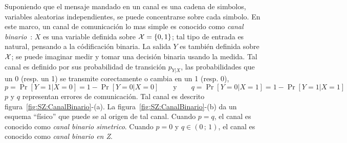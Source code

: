 \begin{figure}[h!]
%
\begin{center}  \end{center}
%
\label{fig:SZ:CanalComunicacion}
\end{figure}




Suponiendo  que el  mensaje  mandado en  un  canal es  una  cadena de  simbolos,
variables   aleatorias  independientes,   se  puede   concentrarse   sobre  cada
simbolo. En  este marco, un  canal de comunicaci\'on  lo mas simple  es conocido
como  {\it canal  binario}~\cite[Sec.~15]{Sha48}: $X$  es una  variable definida
sobre  $\mathcal{X} =  \{ 0  , 1  \}$;  tal tipo  de entrada  es natural,  pensando a  la
c\'odificaci\'on binaria.   La salida $Y$  es tambi\'en definida sobre  $\mathcal{X}$; se
puede imaginar medir y tomar una decisi\'on binaria usando la medida.  Tal canal
es   definido  por  sus   probabilidad  de   transici\'on  $p_{Y|X}$,   \ie  las
probabilidades que un 0 (resp. un 1)  se transmite corectamente o cambia en un 1
(resp. 0),  \ie
%
\[
p = \Pr[Y = 1 | X = 0] = 1 - \Pr[Y = 0 | X = 0] \qquad \mbox{y} \qquad q = \Pr[Y
= 0 | X = 1] = 1 - \Pr[Y = 1 | X = 1]
\]
%
$p$  y  $q$  representan  errores  de comunicaci\'on.   Tal  canal  es  descrito
figura~\ref{fig:SZ:CanalBinario}-(a).   La  figura~\ref{fig:SZ:CanalBinario}-(b)
da un esquema ``f\'isico'' que puede se  al origen de tal canal. Cuando $p = q$,
el canal es conocido como {\it canal binario simetrico}. Cuando $p = 0$ y $q \in
(0 \, ; \, 1)$, el canal es conocido como {\it canal binario en Z}.

